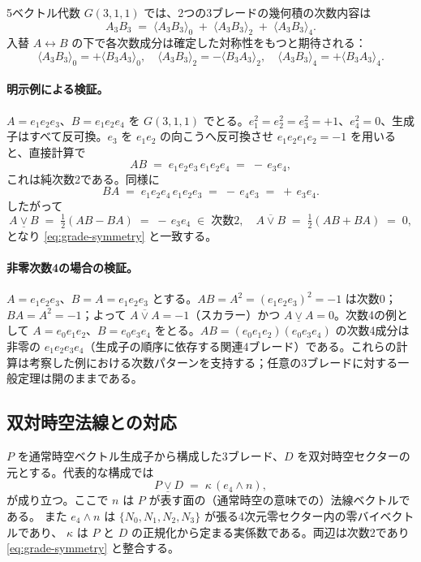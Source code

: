 \documentclass[dvipdfmx,11pt,a4paper]{article}
\theoremstyle{definition}
\theoremstyle{plain}
\theoremstyle{remark}
\begin{document}
5ベクトル代数 $G(3,1,1)$ では、2つの3ブレードの幾何積の次数内容は
\[
A_{3}B_{3} \;=\; \langle A_{3}B_{3}\rangle_{0} \;+\; \langle A_{3}B_{3}\rangle_{2} \;+\; \langle A_{3}B_{3}\rangle_{4}.
\]
入替 $A\leftrightarrow B$ の下で各次数成分は確定した対称性をもつと期待される：
\begin{equation}
\langle A_{3}B_{3}\rangle_{0} = +\langle B_{3}A_{3}\rangle_{0},
\quad
\langle A_{3}B_{3}\rangle_{2} = -\langle B_{3}A_{3}\rangle_{2},
\quad
\langle A_{3}B_{3}\rangle_{4} = +\langle B_{3}A_{3}\rangle_{4}.
\label{eq:grade-symmetry}
\end{equation}

\paragraph{明示例による検証。}
$A=e_{1}e_{2}e_{3}$、$B=e_{1}e_{2}e_{4}$ を $G(3,1,1)$ でとる。$e_{1}^{2}=e_{2}^{2}=e_{3}^{2}=+1$、$e_{4}^{2}=0$、生成子はすべて反可換。$e_{3}$ を $e_{1}e_{2}$ の向こうへ反可換させ $e_{1}e_{2}e_{1}e_{2}=-1$ を用いると、直接計算で
\[
AB \;=\; e_{1}e_{2}e_{3}\,e_{1}e_{2}e_{4} \;=\; -\,e_{3}e_{4},
\]
これは純次数2である。同様に
\[
BA \;=\; e_{1}e_{2}e_{4}\,e_{1}e_{2}e_{3} \;=\; -\,e_{4}e_{3} \;=\; +\,e_{3}e_{4}.
\]
したがって
\[
A\mathbin{\underline{\vee}}B \;=\; \tfrac{1}{2}(AB-BA) \;=\; -\,e_{3}e_{4} \;\in\; \text{次数2},
\quad
A\mathbin{\overline{\vee}}B \;=\; \tfrac{1}{2}(AB+BA) \;=\; 0,
\]
となり \eqref{eq:grade-symmetry} と一致する。

\paragraph{非零次数4の場合の検証。}
$A=e_{1}e_{2}e_{3}$、$B=A=e_{1}e_{2}e_{3}$ とする。$AB=A^{2}=(e_{1}e_{2}e_{3})^{2}=-1$ は次数0；$BA=A^{2}=-1$；よって $A\mathbin{\overline{\vee}}A=-1$（スカラー）かつ $A\mathbin{\underline{\vee}}A=0$。次数4の例として $A=e_{0}e_{1}e_{2}$、$B=e_{0}e_{3}e_{4}$ をとる。$AB=(e_{0}e_{1}e_{2})(e_{0}e_{3}e_{4})$ の次数4成分は非零の $e_{1}e_{2}e_{3}e_{4}$（生成子の順序に依存する関連4ブレード）である。これらの計算は考察した例における次数パターンを支持する；任意の3ブレードに対する一般定理は開のままである。

\subsection{双対時空法線との対応}

$P$ を通常時空ベクトル生成子から構成した3ブレード、$D$ を双対時空セクターの元とする。代表的な構成では
\begin{equation}
P \mathbin{\underline{\vee}} D \;=\; \kappa\,(e_{4}\wedge n),
\label{eq:appB-normal}
\end{equation}
が成り立つ。ここで $n$ は $P$ が表す面の（通常時空の意味での）法線ベクトルである。
また $e_{4}\wedge n$ は $\{N_{0},N_{1},N_{2},N_{3}\}$ が張る4次元零セクター内の零バイベクトルであり、
$\kappa$ は $P$ と $D$ の正規化から定まる実係数である。両辺は次数2であり \eqref{eq:grade-symmetry} と整合する。
\end{document}
